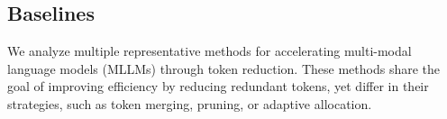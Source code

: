 

\subsection{Baselines}
We analyze multiple representative methods for accelerating multi-modal language models (MLLMs) through token reduction. These methods share the goal of improving efficiency by reducing redundant tokens, yet differ in their strategies, such as token merging, pruning, or adaptive allocation.

